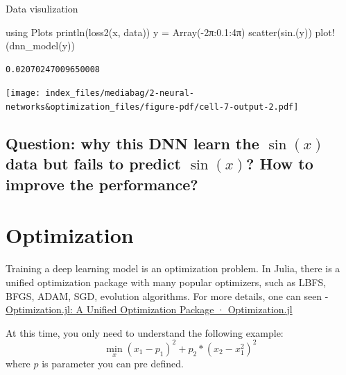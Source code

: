 \documentclass[
  letterpaper,
  DIV=11,
  numbers=noendperiod]{scrreport}
\newenvironment{Shaded}{\begin{snugshade}}{\end{snugshade}}
\newcommand{\BuiltInTok}[1]{\textcolor[rgb]{0.00,0.23,0.31}{#1}}
\newcommand{\CharTok}[1]{\textcolor[rgb]{0.13,0.47,0.30}{#1}}
\newcommand{\FloatTok}[1]{\textcolor[rgb]{0.68,0.00,0.00}{#1}}
\newcommand{\FunctionTok}[1]{\textcolor[rgb]{0.28,0.35,0.67}{#1}}
\newcommand{\ImportTok}[1]{\textcolor[rgb]{0.00,0.46,0.62}{#1}}
\newcommand{\NormalTok}[1]{\textcolor[rgb]{0.00,0.23,0.31}{#1}}
\newcommand{\OperatorTok}[1]{\textcolor[rgb]{0.37,0.37,0.37}{#1}}
\begin{document}
Data visulization

\begin{Shaded}
\begin{Highlighting}[]
\ImportTok{using} \BuiltInTok{Plots}
\FunctionTok{println}\NormalTok{(}\FunctionTok{loss2}\NormalTok{(x, data))}
\NormalTok{y }\OperatorTok{=} \FunctionTok{Array}\NormalTok{(}\OperatorTok{{-}}\FloatTok{2}\NormalTok{π}\OperatorTok{:}\FloatTok{0.1}\OperatorTok{:}\FloatTok{4}\NormalTok{π)}\CharTok{\textquotesingle{}}
\FunctionTok{scatter}\NormalTok{(}\FunctionTok{sin}\NormalTok{.(y)}\CharTok{\textquotesingle{})}
\FunctionTok{plot!}\NormalTok{(}\FunctionTok{dnn\_model}\NormalTok{(y)}\CharTok{\textquotesingle{})}
\end{Highlighting}
\end{Shaded}

\begin{verbatim}
0.02070247009650008
\end{verbatim}

\texttt{[image: index\_files/mediabag/2-neural-networks\&optimization\_files/figure-pdf/cell-7-output-2.pdf]}

\subsection{\texorpdfstring{Question: why this DNN learn the \(\sin(x)\)
data but fails to predict \(\sin(x)\)? How to improve the
performance?}{Question: why this DNN learn the \textbackslash sin(x) data but fails to predict \textbackslash sin(x)? How to improve the performance?}}\label{question-why-this-dnn-learn-the-sinx-data-but-fails-to-predict-sinx-how-to-improve-the-performance}

\section{Optimization}\label{optimization}

Training a deep learning model is an optimization problem. In Julia,
there is a unified optimization package with many popular optimizers,
such as LBFS, BFGS, ADAM, SGD, evolution algorithms. For more details,
one can seen -
\href{https://docs.sciml.ai/Optimization/stable/}{Optimization.jl: A
Unified Optimization Package · Optimization.jl}

At this time, you only need to understand the following example:
\[\min_{x} (x_1-p_1)^2+p_2*(x_2-x_1^2)^2\] where \(p\) is parameter you
can pre defined.
\end{document}
